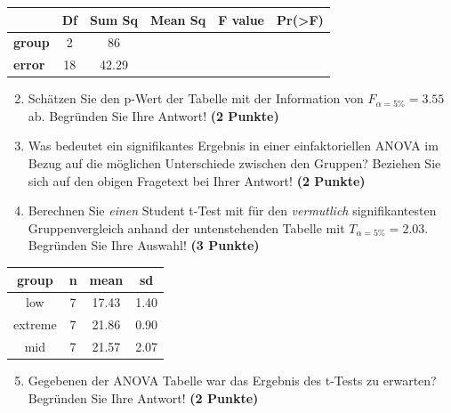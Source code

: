 \documentclass[a4paper, 9pt]{scrartcl}\usepackage[]{graphicx}\usepackage[]{xcolor}
\newenvironment{knitrout}{}{} %
\begin{document}
\vspace{1Ex}

\begin{center}
  \Large
  \begin{tabular}{l|c|c|c|c|c}
     & \textbf{Df} & \textbf{Sum Sq} & \textbf{Mean Sq} & \textbf{F value} & \textbf{Pr(>F)} \strut\\
    \hline
   \textbf{group}  & 2 & 86 &  &  &  \strut\\
    \hline
   \textbf{error}  & 18 & 42.29 &  &  &  \strut\\
  \end{tabular}
\end{center}

\vspace{1Ex}

\begin{enumerate}
  \setcounter{enumi}{1}
\item Sch{\"a}tzen Sie den p-Wert der Tabelle mit der Information von
  $F_{\alpha = 5\%} = 3.55$ ab. Begr{\"u}nden Sie Ihre
  Antwort! \textbf{(2 Punkte)}
\item Was bedeutet ein signifikantes Ergebnis in einer einfaktoriellen
  ANOVA im Bezug auf die m{\"o}glichen Unterschiede zwischen den Gruppen?
  Beziehen Sie sich auf den obigen Fragetext bei Ihrer Antwort!  \textbf{(2
    Punkte)}
\item Berechnen Sie \textit{einen} Student t-Test mit f{\"u}r den \textit{vermutlich}
  signifikantesten Gruppenvergleich anhand der untenstehenden Tabelle mit
  $T_{\alpha = 5\%} = 2.03$. Begr{\"u}nden Sie Ihre Auswahl! \textbf{(3 Punkte)}
\end{enumerate}

\begin{knitrout}
\color{fgcolor}\begin{table}[!h]
\centering
\begin{tabular}{cccc}
\toprule
group & n & mean & sd\\
\midrule
low & 7 & 17.43 & 1.40\\
extreme & 7 & 21.86 & 0.90\\
mid & 7 & 21.57 & 2.07\\
\bottomrule
\end{tabular}
\end{table}

\end{knitrout}

\begin{enumerate}
  \setcounter{enumi}{4}
\item Gegebenen der ANOVA Tabelle war das Ergebnis des t-Tests zu erwarten?
  Begr{\"u}nden Sie Ihre Antwort! \textbf{(2 Punkte)}
\end{enumerate}
\end{document}
